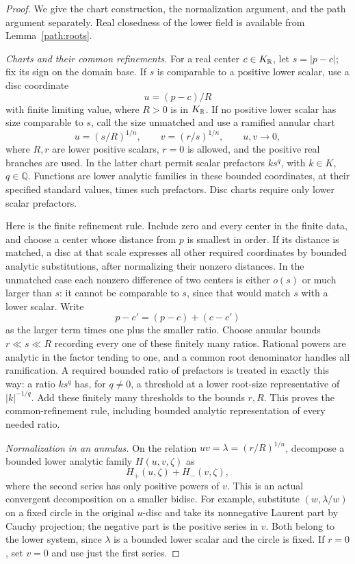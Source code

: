 \begin{proof}
We give the chart construction, the normalization argument, and the
path argument separately.  Real closedness of the lower field is
available from Lemma~\ref{path:roots}.

\emph{Charts and their common refinements.}
For a real center \(c\in K_{\mathbb{R}}\), let \(s=|p-c|\); fix its sign on
the domain base.  If \(s\) is comparable to a positive lower scalar,
use a disc coordinate
\[
 u=(p-c)/R
\]
with finite limiting value, where \(R>0\) is in \(K_{\mathbb{R}}\).  If no
positive lower scalar has size comparable to \(s\), call the size
unmatched and use a ramified annular chart
\begin{equation}\label{path:eq-annulus}
 u=(s/R)^{1/n},\qquad v=(r/s)^{1/n},\qquad u,v\longrightarrow0,
\end{equation}
where \(R,r\) are lower positive scalars, \(r=0\) is allowed, and the
positive real branches are used.  In the latter chart permit scalar
prefactors \(ks^q\), with \(k\in K\), \(q\in\mathbb Q\).  Functions
are lower analytic families in these bounded coordinates, at their
specified standard values, times such prefactors.  Disc charts require
only lower scalar prefactors.

Here is the finite refinement rule.  Include zero and every center in
the finite data, and choose a center whose distance from \(p\) is
smallest in order.  If its distance is matched, a disc at that scale
expresses all other required coordinates by bounded analytic
substitutions, after normalizing their nonzero distances.  In the
unmatched case each nonzero difference of two centers is either
\(o(s)\) or much larger than \(s\): it cannot be comparable to \(s\),
since that would match \(s\) with a lower scalar.  Write
\[
 p-c'=(p-c)+(c-c')
\]
as the larger term times one plus the smaller ratio.  Choose annular
bounds \(r\ll s\ll R\) recording every one of these finitely many
ratios.  Rational powers are analytic in the factor tending to one,
and a common root denominator handles all ramification.  A required
bounded ratio of prefactors is treated in exactly this way: a ratio
\(ks^q\) has, for \(q\ne0\), a threshold at a lower root-size
representative of \(|k|^{-1/q}\).  Add these finitely many thresholds
to the bounds \(r,R\).  This proves the common-refinement rule,
including bounded analytic representation of every needed ratio.

\emph{Normalization in an annulus.}
On the relation \(uv=\lambda=(r/R)^{1/n}\), decompose a bounded
lower analytic family \(H(u,v,\zeta)\) as
\[
 H_+(u,\zeta)+H_-(v,\zeta),
\]
where the second series has only positive powers of \(v\).  This is
an actual convergent decomposition on a smaller bidisc.  For example,
substitute \((w,\lambda/w)\) on a fixed circle in the original
\(u\)-disc and take its nonnegative Laurent part by Cauchy projection;
the negative part is the positive series in \(v\).  Both belong to
the lower system, since \(\lambda\) is a bounded lower scalar and
the circle is fixed.  If \(r=0\), set \(v=0\) and use just the first
series.


\end{proof}
